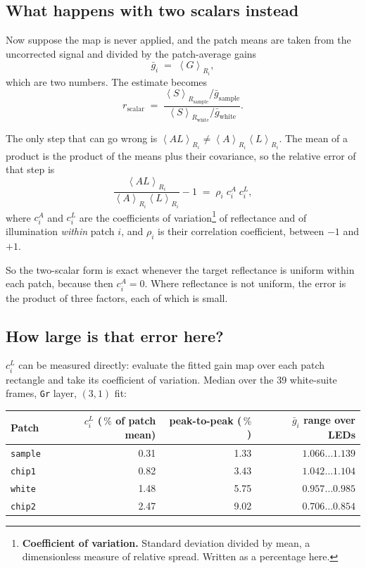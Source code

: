 \documentclass[11pt, a4paper]{article}
\newcommand{\code}[1]{\texttt{#1}}
\newcommand{\pct}{\,\%}
\newcommand{\mean}[2]{\left\langle #1 \right\rangle_{#2}}
\begin{document}
\subsection{What happens with two scalars instead}

Now suppose the map is never applied,
and the patch means are taken from the uncorrected signal
and divided by the patch-average gains
\begin{equation}
  \bar{g}_i \;=\; \mean{G}{R_i} ,
\end{equation}
which are two numbers.
The estimate becomes
\begin{equation}
  r_{\mathrm{scalar}}
  \;=\;
  \frac{\mean{S}{R_{\mathrm{sample}}} \big/ \bar{g}_{\mathrm{sample}}}
       {\mean{S}{R_{\mathrm{white}}}  \big/ \bar{g}_{\mathrm{white}}} .
  \label{eq:rscalar}
\end{equation}

The only step that can go wrong is
$\mean{A L}{R_i} \ne \mean{A}{R_i}\mean{L}{R_i}$.
The mean of a product is the product of the means plus their covariance,
so the relative error of that step is
\begin{equation}
  \frac{\mean{AL}{R_i}}{\mean{A}{R_i}\mean{L}{R_i}} - 1
  \;=\;
  \rho_i \; c^{A}_i \; c^{L}_i ,
  \label{eq:cov}
\end{equation}
where $c^{A}_i$ and $c^{L}_i$ are the coefficients of
variation\footnote{\textbf{Coefficient of variation.}
Standard deviation divided by mean, a dimensionless measure of relative
spread.
Written as a percentage here.}
of reflectance and of illumination \emph{within} patch $i$,
and $\rho_i$ is their correlation coefficient, between $-1$ and $+1$.

So the two-scalar form is exact whenever the target reflectance
is uniform within each patch,
because then $c^{A}_i = 0$.
Where reflectance is not uniform,
the error is the product of three factors,
each of which is small.

\subsection{How large is that error here?}

$c^{L}_i$ can be measured directly:
evaluate the fitted gain map over each patch rectangle
and take its coefficient of variation.
Median over the 39 white-suite frames, \code{Gr} layer, $(3,1)$ fit:

\begin{center}
\begin{tabular}{lrrr}
\toprule
Patch & $c^{L}_i$ ($\pct$ of patch mean) & peak-to-peak ($\pct$)
      & $\bar{g}_i$ range over LEDs \\
\midrule
\code{sample} & 0.31 & 1.33 & $1.066 \ldots 1.139$ \\
\code{chip1}  & 0.82 & 3.43 & $1.042 \ldots 1.104$ \\
\code{white}  & 1.48 & 5.75 & $0.957 \ldots 0.985$ \\
\code{chip2}  & 2.47 & 9.02 & $0.706 \ldots 0.854$ \\
\bottomrule
\end{tabular}
\end{center}
\end{document}
